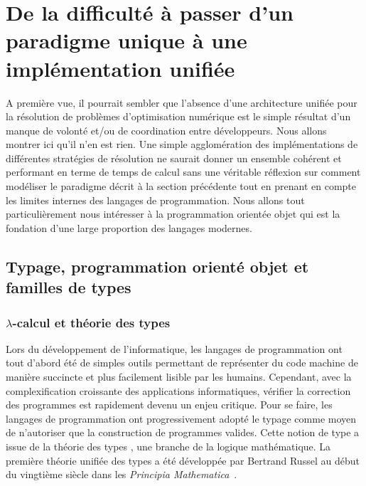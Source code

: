 \section{De la dif\-ficulté à passer d'un paradigme uni\-que à une implémentation unifiée}


A première vue, il pourrait sembler que l'absence d'une architecture
unifiée pour la résolution de problèmes d'optimisation numérique est
le simple résultat d'un manque de volonté et/ou de coordination entre
développeurs. Nous allons montrer ici qu'il n'en est rien. Une simple
agglomération des implémentations de différentes stratégies de
résolution ne saurait donner un ensemble cohérent et performant en
terme de temps de calcul sans une véritable réflexion sur comment
modéliser le paradigme décrit à la section précédente tout en prenant
en compte les limites internes des langages de programmation. Nous
allons tout particulièrement nous intéresser à la programmation
orientée objet qui est la fondation d'une large proportion des
langages modernes.


\subsection{Typage, programmation orienté objet et familles de types}

\subsubsection{$\lambda$-calcul et théorie des types}

Lors du développement de l'informatique, les langages de programmation
ont tout d'abord été de simples outils permettant de représenter du
code machine de manière succincte et plus facilement lisible par les
humains. Cependant, avec la complexification croissante des
applications informatiques, vérifier la correction des programmes est
rapidement devenu un enjeu critique. Pour se faire, les langages de
programmation ont progressivement adopté le typage comme moyen de
n'autoriser que la construction de programmes valides. Cette notion de
type a issue de la théorie des types , une
branche de la logique mathématique. La première théorie unifiée des
types a été développée par Bertrand Russel  au
début du vingtième siècle dans les \emph{Principia
  Mathematica}~\citep{pm}.


